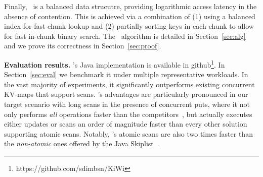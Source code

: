 Finally, \kiwi\ is a balanced data strucutre, providing logarithmic access latency in the absence of contention.
This is achieved via a combination of (1) using a balanced index for fast chunk lookup and (2) partially sorting keys in each
chunk to allow for fast in-chunk binary search. The \kiwi\ algorithm is detailed in Section~\ref{sec:alg}
and we prove its correctness in Section~\ref{sec:proof}.


{\bf{Evaluation results.}}
\kiwi's Java implementation is available in github\footnote{https://github.com/sdimbsn/KiWi}. In Section~\ref{sec:eval} we benchmark it under multiple representative workloads.
In the vast majority of  experiments, it significantly outperforms existing concurrent KV-maps that support scans.
\kiwi's advantages are particularly pronounced in our target scenario with long scans in the presence of concurrent puts, where
it not only performs \emph{all} operations faster than the competitors~\cite{BrownA12,BronsonCCO2010},
but actually executes either updates or scans an order of magnitude faster than every other solution supporting atomic scans.
Notably, \kiwi's atomic scans are also two times faster than the \emph{non-atomic}
ones offered by the Java Skiplist~\cite{JavaConcurrentSkipList}. 


